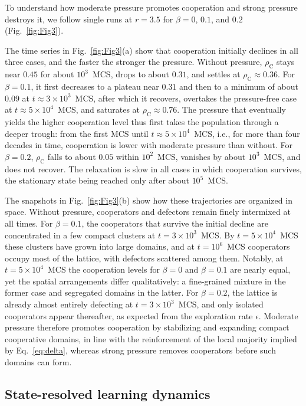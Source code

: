 \documentclass[%
  aip,cha,
  amsmath,amssymb,
  reprint,
  article-title,
]{revtex4-2}
\begin{document}
To understand how moderate pressure promotes cooperation and strong pressure destroys it, we follow single runs at $r=3.5$ for $\beta=0$, $0.1$, and $0.2$ (Fig.~\ref{fig:Fig3}).

The time series in Fig.~\ref{fig:Fig3}(a) show that cooperation initially declines in all three cases, and the faster the stronger the pressure. Without pressure, $\rho_{\mathrm{C}}$ stays near $0.45$ for about $10^{3}$~MCS, drops to about $0.31$, and settles at $\rho_{\mathrm{C}}\approx0.36$. For $\beta=0.1$, it first decreases to a plateau near $0.31$ and then to a minimum of about $0.09$ at $t\approx3\times10^{3}$~MCS, after which it recovers, overtakes the pressure-free case at $t\approx5\times10^{4}$~MCS, and saturates at $\rho_{\mathrm{C}}\approx0.76$. The pressure that eventually yields the higher cooperation level thus first takes the population through a deeper trough: from the first MCS until $t\approx5\times10^{4}$~MCS, i.e., for more than four decades in time, cooperation is lower with moderate pressure than without. For $\beta=0.2$, $\rho_{\mathrm{C}}$ falls to about $0.05$ within $10^{2}$~MCS, vanishes by about $10^{3}$~MCS, and does not recover. The relaxation is slow in all cases in which cooperation survives, the stationary state being reached only after about $10^{5}$~MCS.

The snapshots in Fig.~\ref{fig:Fig3}(b) show how these trajectories are organized in space. Without pressure, cooperators and defectors remain finely intermixed at all times. For $\beta=0.1$, the cooperators that survive the initial decline are concentrated in a few compact clusters at $t=3\times10^{3}$~MCS. By $t=5\times10^{4}$~MCS these clusters have grown into large domains, and at $t=10^{6}$~MCS cooperators occupy most of the lattice, with defectors scattered among them. Notably, at $t=5\times10^{4}$~MCS the cooperation levels for $\beta=0$ and $\beta=0.1$ are nearly equal, yet the spatial arrangements differ qualitatively: a fine-grained mixture in the former case and segregated domains in the latter. For $\beta=0.2$, the lattice is already almost entirely defecting at $t=3\times10^{3}$~MCS, and only isolated cooperators appear thereafter, as expected from the exploration rate $\epsilon$. Moderate pressure therefore promotes cooperation by stabilizing and expanding compact cooperative domains, in line with the reinforcement of the local majority implied by Eq.~\eqref{eq:delta}, whereas strong pressure removes cooperators before such domains can form.

\subsection{State-resolved learning dynamics}\label{sec:res-learning}
\end{document}
